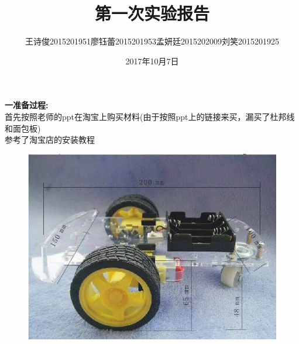 \documentclass[19pt,a4paper]{article}
\title{第一次实验报告}
\author{王诗俊2015201951\quad 廖钰蕾2015201953\quad  孟妍廷2015202009\quad  刘笑2015201925}
\date{2017年10月7日}
\begin{document}
\maketitle

\textbf{一\quad 准备过程:}\\
\indent 首先按照老师的ppt在淘宝上购买材料(由于按照ppt上的链接来买，漏买了杜邦线和面包板)\\
\indent 参考了淘宝店的安装教程\\
\begin{figure}[htbp]
 \centering
 \includegraphics[scale=0.4]{2.jpeg}
\end{figure}\\
\end{document}
